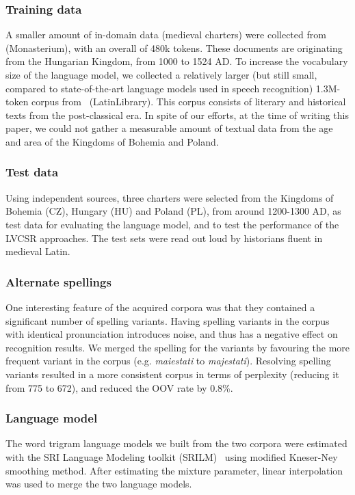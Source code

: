 \documentclass[runningheads,a4paper]{llncs}
\begin{document}
\subsubsection{Training data}\label{traintext}
A smaller amount of in-domain data (medieval charters) were collected from~\cite{monasterium} (Monasterium), with an overall of 480k tokens.
These documents are originating from the Hungarian Kingdom, from 1000 to 1524 AD.
To increase the vocabulary size of the language model, we collected a relatively larger (but still small, compared to state-of-the-art language models used in speech recognition) 1.3M-token corpus from~\cite{latinlibrary} (LatinLibrary).
This corpus consists of literary and historical texts from the post-classical era.
In spite of our efforts, at the time of writing this paper, we could not gather a measurable amount of textual data from the age and area of the Kingdoms of Bohemia and Poland.
\subsubsection{Test data}\label{testtext}
Using independent sources, three charters were selected from the Kingdoms of Bohemia (CZ), Hungary (HU) and Poland (PL), from around 1200-1300 AD, as test data for evaluating the language model, and to test the performance of the LVCSR approaches.
The test sets were read out loud by historians fluent in medieval Latin.
\subsubsection{Alternate spellings}
One interesting feature of the acquired corpora was that they contained a significant number of spelling variants.
Having spelling variants in the corpus with identical pronunciation introduces noise, and thus has a negative effect on recognition results.
We merged the spelling for the variants by favouring the more frequent variant in the corpus (e.g. \textit{maiestati} to \textit{majestati}).
Resolving spelling variants resulted in a more consistent corpus in terms of perplexity (reducing it from 775 to 672), and reduced the OOV rate by 0.8\%.
\subsubsection{Language model}
The word trigram language models we built from the two corpora were estimated with the SRI Language Modeling toolkit (SRILM)~\cite{srilm} using modified Kneser-Ney smoothing method.
After estimating the mixture parameter, linear interpolation was used to merge the two language models.
\end{document}
